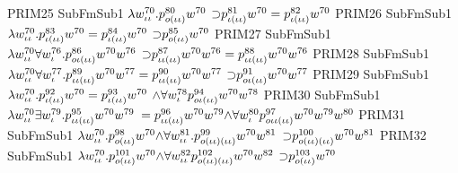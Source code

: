 \begin{tpsexample}
     PRIM25   SubFmSub1   \(\lambda w \sp{{70}}\sb{\iota\iota} .p \sp{{80}}\sb{o(\iota\iota)}  w \sp{{70}}  \)
               \(\mathord{\supset} p \sp{{81}}\sb{\iota(\iota\iota)}  w \sp{{70}}  = p \sp{{82}}\sb{\iota(\iota\iota)}  w \sp{{70}}\)
     PRIM26   SubFmSub1   \(\lambda w \sp{{70}}\sb{\iota\iota} .p \sp{{83}}\sb{\iota(\iota\iota)}  w \sp{{70}}  = p \sp{{84}}\sb{\iota(\iota\iota)}  w \sp{{70}}  \)
               \(\mathord{\supset} p \sp{{85}}\sb{o(\iota\iota)}  w \sp{{70}}\)
     PRIM27   SubFmSub1   \(\lambda w \sp{{70}}\sb{\iota\iota}   \forall w \sp{{76}}\sb{\iota} .p \sp{{86}}\sb{o\iota(\iota\iota)}  w \sp{{70}}  w \sp{{76}}  \)
               \(\mathord{\supset} p \sp{{87}}\sb{\iota\iota(\iota\iota)}  w \sp{{70}}  w \sp{{76}}  = p \sp{{88}}\sb{\iota\iota(\iota\iota)}  w \sp{{70}}  w \sp{{76}}\)
     PRIM28   SubFmSub1   \(\lambda w \sp{{70}}\sb{\iota\iota}   \forall w \sp{{77}}\sb{\iota} .p \sp{{89}}\sb{\iota\iota(\iota\iota)}  w \sp{{70}}  w \sp{{77}}  = p \sp{{90}}\sb{\iota\iota(\iota\iota)}  w \sp{{70}}  w \sp{{77}}  \)
               \(\mathord{\supset} p \sp{{91}}\sb{o\iota(\iota\iota)}  w \sp{{70}}  w \sp{{77}}\)
     PRIM29   SubFmSub1   \(\lambda w \sp{{70}}\sb{\iota\iota} .p \sp{{92}}\sb{\iota(\iota\iota)}  w \sp{{70}}  = p \sp{{93}}\sb{\iota(\iota\iota)}  w \sp{{70}}  \)
               \(\land  \forall w \sp{{78}}\sb{\iota}  p \sp{{94}}\sb{o\iota(\iota\iota)}  w \sp{{70}}  w \sp{{78}}\)
     PRIM30   SubFmSub1   \(\lambda w \sp{{70}}\sb{\iota\iota}   \exists w \sp{{79}}\sb{\iota} .p \sp{{95}}\sb{\iota\iota(\iota\iota)}  w \sp{{70}}  w \sp{{79}}  \)
               \(= p \sp{{96}}\sb{\iota\iota(\iota\iota)}  w \sp{{70}}  w \sp{{79}}  \mathord{\wedge}  \forall w \sp{{80}}\sb{\iota}  p \sp{{97}}\sb{o\iota\iota(\iota\iota)}  w \sp{{70}}  w \sp{{79}}  w \sp{{80}}\)
     PRIM31   SubFmSub1   \(\lambda w \sp{{70}}\sb{\iota\iota} .p \sp{{98}}\sb{o(\iota\iota)}  w \sp{{70}}  \mathord{\wedge}  \forall w \sp{{81}}\sb{\iota\iota} .p \sp{{99}}\sb{o(\iota\iota)(\iota\iota)}  w \sp{{70}}  w \sp{{81}}  \)
               \(\mathord{\supset} p \sp{{100}}\sb{o(\iota\iota)(\iota\iota)}  w \sp{{70}}  w \sp{{81}}\)
     PRIM32   SubFmSub1   \(\lambda w \sp{{70}}\sb{\iota\iota} .p \sp{{101}}\sb{o(\iota\iota)}  w \sp{{70}}  \mathord{\wedge}  \forall w \sp{{82}}\sb{\iota\iota}  p \sp{{102}}\sb{o(\iota\iota)(\iota\iota)}  w \sp{{70}}  w \sp{{82}}  \)
               \(\mathord{\supset} p \sp{{103}}\sb{o(\iota\iota)}  w \sp{{70}}\)

\end{tpsexample}
